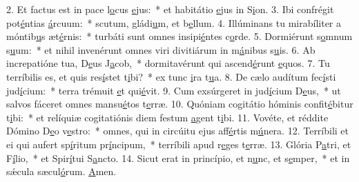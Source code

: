 2. Et factus est in pace l\uline{o}cus \uline{e}jus:~* et habitátio \uline{e}jus in S\uline{i}on.
3. Ibi confrégit pot\uline{é}ntias \uline{á}rcuum:~* scutum, gládi\uline{u}m, et b\uline{e}llum.
4. Illúminans tu mirabíliter a móntib\uline{u}s æt\uline{é}rnis:~* turbáti sunt omnes insipi\uline{é}ntes c\uline{o}rde.
5. Dormiérunt s\uline{o}mnum s\uline{u}um:~* et nihil invenérunt omnes viri divitiárum in m\uline{á}nibus s\uline{u}is.
6. Ab increpatióne tua, D\uline{e}us J\uline{a}cob,~* dormitavérunt qui ascend\uline{é}runt \uline{e}quos.
7. Tu terríbilis es, et quis res\uline{í}stet t\uline{i}bi?~* ex tunc \uline{i}ra t\uline{u}a.
8. De cælo audítum fec\uline{í}sti jud\uline{í}cium:~* terra trémuit \uline{e}t qui\uline{é}vit.
9. Cum exsúrgeret in jud\uline{í}cium D\uline{e}us,~* ut salvos fáceret omnes mansu\uline{é}tos t\uline{e}rræ.
10. Quóniam cogitátio hóminis confit\uline{é}bitur t\uline{i}bi:~* et relíquiæ cogitatiónis diem festum \uline{a}gent t\uline{i}bi.
11. Vovéte, et réddite Dómino D\uline{e}o v\uline{e}stro:~* omnes, qui in circúitu ejus aff\uline{é}rtis m\uline{ú}nera.
12. Terríbili et ei qui aufert sp\uline{í}ritum pr\uline{í}ncipum,~* terríbili apud r\uline{e}ges t\uline{e}rræ.
13. Glória P\uline{a}tri, et F\uline{í}lio,~* et Spir\uline{í}tui S\uline{a}ncto.
14. Sicut erat in princípio, et n\uline{u}nc, et s\uline{e}mper,~* et in sǽcula sæcul\uline{ó}rum. \uline{A}men.
